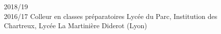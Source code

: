 \documentclass[letterpaper]{cvtemplate_fr} %
\begin{document}
\begin{cvbody}

\cvitem
	{2018/19\\ \mbox{}\hfill 2016/17}
	{}
	{Colleur en classes pr\'eparatoires}
	{Lyc\'ee du Parc, Institution des Chartreux, Lyc\'ee La Martinière Diderot (Lyon) }
	{}{}{}
	{}
	{
	}



\end{cvbody}
\end{document}
